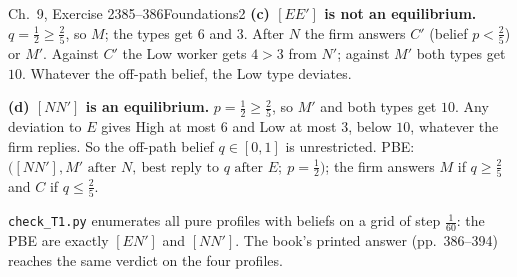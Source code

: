 \begin{exsol}{\MG{} Ch.~9, Exercise 2}{385--386}{Foundations}{2}
\textbf{(c) $[EE']$ is not an equilibrium.} $q = \frac12 \ge \frac25$, so $M$; the types get $6$ and $3$.
After $N$ the firm answers $C'$ (belief $p < \frac25$) or $M'$. Against $C'$ the Low worker gets $4 > 3$
from $N'$; against $M'$ both types get $10$. Whatever the off-path belief, the Low type deviates.

\textbf{(d) $[NN']$ is an equilibrium.} $p = \frac12 \ge \frac25$, so $M'$ and both types get $10$. Any
deviation to $E$ gives High at most $6$ and Low at most $3$, below $10$, whatever the firm
replies. So the off-path belief $q \in [0,1]$ is unrestricted. PBE: $\bigl([NN'], M' \text{ after }
N,\ \text{best reply to } q \text{ after } E;\ p = \frac12\bigr)$; the firm answers $M$ if $q \ge \frac25$
and $C$ if $q \le \frac25$.

\verify \texttt{check\_T1.py} enumerates all pure profiles with beliefs on a grid of step $\frac1{60}$:
the PBE are exactly $[EN']$ and $[NN']$. The book's printed answer (pp.~386--394) reaches the same
verdict on the four profiles.

\end{exsol}
